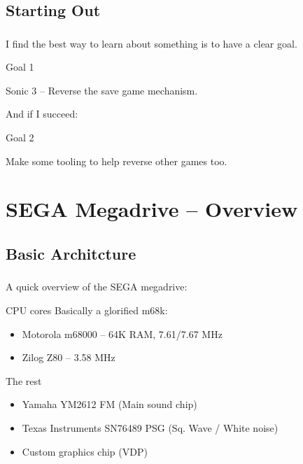 \documentclass{beamer}
\begin{document}
\subsection{Starting Out}
\begin{frame}[fragile]
\frametitle{\insertsubsection}

\vfill
I find the best way to learn about something is to have a clear goal.


\begin{block}{Goal 1}
\begin{center}
Sonic 3 -- Reverse the save game mechanism.
\end{center}
\end{block}

\vfill
And if I succeed:

\begin{block}{Goal 2}
\begin{center}
Make some tooling to help reverse other games too.
\end{center}
\end{block}
\end{frame}
\vfill


\section{SEGA Megadrive -- Overview}
\subsection{Basic Architcture}

\begin{frame}[fragile]
\frametitle{\insertsubsection}

A quick overview of the SEGA megadrive:

\begin{block}{CPU cores}
Basically a glorified m68k:

\begin{itemize}
\item Motorola m68000 -- 64K RAM, 7.61/7.67 MHz
\item Zilog Z80 -- 3.58 MHz
\end{itemize}
\end{block}

\vfill

\begin{block}{The rest}
\begin{itemize}
\item Yamaha YM2612 FM (Main sound chip)
\item Texas Instruments SN76489 PSG (Sq. Wave / White noise)
\item Custom graphics chip (VDP)
\end{itemize}
\end{block}

\end{frame}
\end{document}
